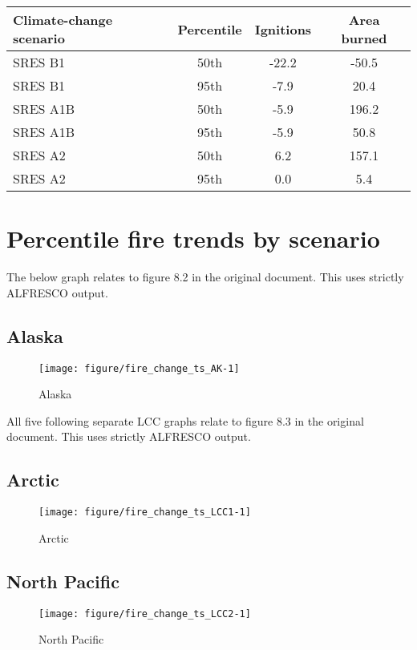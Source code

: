 \documentclass{article}\usepackage[]{graphicx}\usepackage[]{color}
\makeatletter
\def\maxwidth{ %
  \ifdim\Gin@nat@width>\linewidth
    \linewidth
  \else
    \Gin@nat@width
  \fi
}
\newcommand{\headcol}{\rowcolor{tableheadcolor}}
\makeatother
\begin{document}
\begin{table}[ht]
\centering
\begin{tabular}{lccc}
  \headcol 
 \toprule
Climate-change scenario & Percentile & Ignitions & Area burned \\ 
  \midrule
SRES B1 & 50th & -22.2 & -50.5 \\ 
  SRES B1 & 95th & -7.9 & 20.4 \\ 
  SRES A1B & 50th & -5.9 & 196.2 \\ 
  SRES A1B & 95th & -5.9 & 50.8 \\ 
  SRES A2 & 50th & 6.2 & 157.1 \\ 
  SRES A2 & 95th & 0.0 & 5.4 \\ 
   \bottomrule
\end{tabular}
\end{table}


\newpage
\section{Percentile fire trends by scenario}
The below graph relates to figure 8.2 in the original document.
This uses strictly ALFRESCO output.
\subsection{Alaska}
\begin{figure}[H]
\texttt{[image: figure/fire\_change\_ts\_AK-1]} \caption[Alaska]{Alaska\label{fig:fire_change_ts_AK}}
\end{figure}



All five following separate LCC graphs relate to figure 8.3 in the original document.
This uses strictly ALFRESCO output.
\subsection{Arctic}
\begin{figure}[H]
\texttt{[image: figure/fire\_change\_ts\_LCC1-1]} \caption[Arctic]{Arctic\label{fig:fire_change_ts_LCC1}}
\end{figure}



\subsection{North Pacific}
\begin{figure}[H]
\texttt{[image: figure/fire\_change\_ts\_LCC2-1]} \caption[North Pacific]{North Pacific\label{fig:fire_change_ts_LCC2}}
\end{figure}
\end{document}
